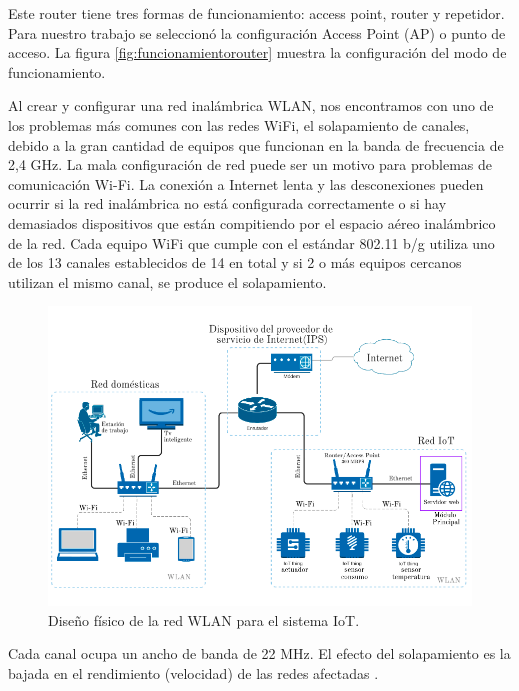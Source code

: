 Este router tiene tres formas de funcionamiento: access point, router y repetidor. Para nuestro trabajo se seleccionó la configuración Access Point (AP) o punto de acceso. La figura \ref{fig:funcionamientorouter} muestra la configuración del modo de funcionamiento.

Al crear y configurar una red inalámbrica WLAN, nos encontramos con uno de los problemas más comunes con las redes WiFi, el solapamiento de canales, debido a la gran cantidad de equipos que funcionan en la banda de frecuencia de 2,4 GHz. La mala configuración de red puede ser un motivo para problemas de comunicación Wi-Fi. La conexión a Internet lenta y las desconexiones pueden ocurrir si la red inalámbrica no está configurada correctamente o si hay demasiados dispositivos que están compitiendo por el espacio aéreo inalámbrico de la red. Cada equipo WiFi que cumple con el estándar 802.11 b/g utiliza uno de los 13 canales establecidos de 14 en total y si 2 o más equipos cercanos utilizan el mismo canal, se produce el solapamiento. 

\begin{landscape} %
\begin{figure}[htpb]
\centering 
\includegraphics[width=1.3\textwidth]{./Figures/rediot.png}
\caption{Diseño físico de la red WLAN para el sistema IoT.}
\label{fig:diagramared}
\end{figure}
\end{landscape} %

Cada canal ocupa un ancho de banda de 22 MHz. El efecto del solapamiento es la bajada en el rendimiento (velocidad) de las redes afectadas \citep{WEBSITE:26}.

